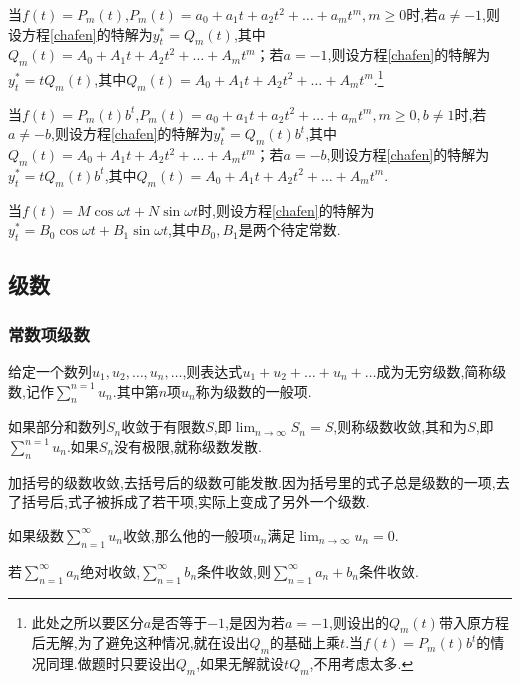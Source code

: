 当$f(t)=P_m(t)$,$P_m(t)=a_0+a_1t+a_2t^2+\dots +a_mt^m,m \geqslant 0$时,若$a\neq-1$,则设方程\ref{chafen}的特解为$y_t^*=Q_m(t)$,其中$Q_m(t)=A_0+A_1t+A_2t^2+\dots +A_mt^m$；若$a=-1$,则设方程\ref{chafen}的特解为$y_t^*=tQ_m(t)$,其中$Q_m(t)=A_0+A_1t+A_2t^2+\dots +A_mt^m$.\footnote{此处之所以要区分$a$是否等于$-1$,是因为若$a=-1$,则设出的$Q_m(t)$带入原方程后无解,为了避免这种情况,就在设出$Q_m$的基础上乘$t$.当$f(t)=P_m(t)b^t$的情况同理.做题时只要设出$Q_m$,如果无解就设$tQ_m$,不用考虑太多.}

当$f(t)=P_m(t)b^t$,$P_m(t)=a_0+a_1t+a_2t^2+\dots +a_mt^m,m \geqslant 0,b\neq1$时,若$a\neq-b$,则设方程\ref{chafen}的特解为$y_t^*=Q_m(t)b^t$,其中$Q_m(t)=A_0+A_1t+A_2t^2+\dots +A_mt^m$；若$a=-b$,则设方程\ref{chafen}的特解为$y_t^*=tQ_m(t)b^t$,其中$Q_m(t)=A_0+A_1t+A_2t^2+\dots +A_mt^m$.

当$f(t)=M\cos \omega t+N\sin \omega t$时,则设方程\ref{chafen}的特解为$y_t^*=B_0\cos \omega t+B_1\sin \omega t$,其中$B_0,B_1$是两个待定常数.

\subsection{级数}
\subsubsection{常数项级数}
\begin{definition}[级数]
    给定一个数列$u_1,u_2,\dots,u_n,\dots$,则表达式$u_1+u_2+\dots+u_n+\dots$成为无穷级数,简称级数,记作$\sum^{n=1}_{n} u_n$.其中第$n$项$u_n$称为级数的一般项.
\end{definition}
\begin{definition}[级数收敛]
    如果部分和数列${S_n}$收敛于有限数$S$,即$\lim_{n \to \infty} S_n=S$,则称级数收敛,其和为$S$,即$\sum^{n=1}_{n} u_n$.如果${S_n}$没有极限,就称级数发散.
\end{definition}
加括号的级数收敛,去括号后的级数可能发散.因为括号里的式子总是级数的一项,去了括号后,式子被拆成了若干项,实际上变成了另外一个级数.

\begin{ttheorem}[（级数收敛的必要条件）]
    如果级数$\sum^{\infty}_{n=1} u_n$收敛,那么他的一般项$u_n$满足$\lim_{n \to \infty} u_n=0$.
\end{ttheorem}

\begin{ttheorem}
    若$\sum^{\infty}_{n=1} a_n$绝对收敛,$\sum^{\infty}_{n=1} b_n$条件收敛,则$\sum^{\infty}_{n=1} a_n+b_n$条件收敛.
\end{ttheorem}

